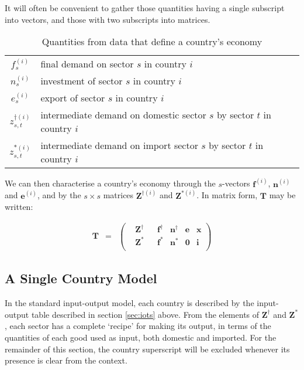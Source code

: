 \documentclass[a4paper]{article}
\begin{document}
It will often be convenient to gather those quantities having a single subscript into vectors, and those with two subscripts into matrices. 
\begin{table}
\begin{center}
\begin{tabular}{cl}\toprule
$f_s^{(i)}$ & final demand on sector $s$ in country $i$\\
$n_s^{(i)}$ & investment of sector $s$ in country $i$\\
$e_s^{(i)}$ & export of sector $s$ in country $i$\\
$z_{s,t}^{\dagger(i)}$ & intermediate demand on domestic sector $s$ by sector $t$ in country $i$\\
$z_{s,t}^{*(i)}$ & intermediate demand on import sector $s$ by sector $t$ in country $i$\\\bottomrule
\end{tabular}
\end{center}
\caption{Quantities from data that define a country's economy}\label{tbl:cvars}
\end{table}

We can then characterise a country's economy through the $s$-vectors $\boldsymbol{f}^{(i)}$, $\boldsymbol{n}^{(i)}$ and $\boldsymbol{e}^{(i)}$, and by the $s\times s$ matrices $\boldsymbol{Z}^{\dagger(i)}$ and $\boldsymbol{Z}^{*(i)}$.
In matrix form, $\boldsymbol{T}$ may be written:

\begin{equation}\label{eqn:Tvectorised}
\begin{array}{rcc}
\boldsymbol{T} & = & 
\left(
	\begin{array}{ccccccc}
 & \boldsymbol{Z}^{\dag} & & \boldsymbol{f}^\dag & \boldsymbol{n}^\dag & \boldsymbol{e} & \boldsymbol{x} \\
 & \boldsymbol{Z}^* & & \boldsymbol{f}^* & \boldsymbol{n}^* & \boldsymbol{0} & \boldsymbol{i} \\
	\end{array} 
\right)
\end{array}
\end{equation}

\subsection{A Single Country Model}\label{sec:countries}
In the standard input-output model, each country is described by the input-output table described in section \ref{sec:iots} above.
From the elements of $\boldsymbol{Z}^\dagger$ and $\boldsymbol{Z}^*$, each sector has a complete `recipe' for making its output, in terms of the quantities of each good used as input, both domestic and imported. For the remainder of this section, the country superscript will be excluded whenever its presence is clear from the context.
\end{document}
